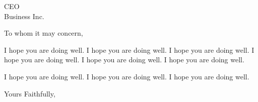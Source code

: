 \documentclass[12pt]{letter} %
\begin{document}
\begin{letter}{CEO \\ Business Inc. }
\opening{To whom it may concern,}

I hope you are doing well. I hope you are doing well. I hope you are doing well. I hope you are doing well. I hope you are doing well. I hope you are doing well.\par
I hope you are doing well. I hope you are doing well. I hope you are doing well.

\closing{Yours Faithfully,}
\end{letter}
\end{document}
